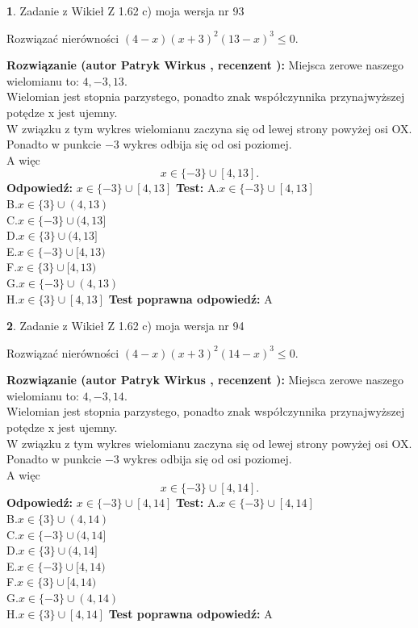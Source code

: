 \documentclass[12pt, a4paper]{article}
\theoremstyle{definition} %
\newtheorem{zad}{}
\newcommand{\zadStart}[1]{\begin{zad}#1\newline}
\newcommand{\zadStop}{\end{zad}}
\newcommand{\rozwStart}[2]{\noindent \textbf{Rozwiązanie (autor #1 , recenzent #2): }\newline}
\newcommand{\rozwStop}{\newline}
\newcommand{\odpStart}{\noindent \textbf{Odpowiedź:}\newline}
\newcommand{\odpStop}{\newline}
\newcommand{\testStart}{\noindent \textbf{Test:}\newline}
\newcommand{\testStop}{\newline}
\newcommand{\kluczStart}{\noindent \textbf{Test poprawna odpowiedź:}\newline}
\newcommand{\kluczStop}{\newline}
\begin{document}
\zadStart{Zadanie z Wikieł Z 1.62 c) moja wersja nr 93}

Rozwiązać nierówności $(4-x)(x+3)^{2}(13-x)^{3}\le0$.
\zadStop
\rozwStart{Patryk Wirkus}{}
Miejsca zerowe naszego wielomianu to: $4, -3, 13$.\\
Wielomian jest stopnia parzystego, ponadto znak współczynnika przy\linebreak najwyższej potędze x jest ujemny.\\ W związku z tym wykres wielomianu zaczyna się od lewej strony powyżej osi OX.\\
Ponadto w punkcie $-3$ wykres odbija się od osi poziomej.\\
A więc $$x \in \{-3\} \cup [4,13].$$
\rozwStop
\odpStart
$x \in \{-3\} \cup [4,13]$
\odpStop
\testStart
A.$x \in \{-3\} \cup [4,13]$\\
B.$x \in \{3\} \cup (4,13)$\\
C.$x \in \{-3\} \cup (4,13]$\\
D.$x \in \{3\} \cup (4,13]$\\
E.$x \in \{-3\} \cup [4,13)$\\
F.$x \in \{3\} \cup [4,13)$\\
G.$x \in \{-3\} \cup (4,13)$\\
H.$x \in \{3\} \cup [4,13]$
\testStop
\kluczStart
A
\kluczStop



\zadStart{Zadanie z Wikieł Z 1.62 c) moja wersja nr 94}

Rozwiązać nierówności $(4-x)(x+3)^{2}(14-x)^{3}\le0$.
\zadStop
\rozwStart{Patryk Wirkus}{}
Miejsca zerowe naszego wielomianu to: $4, -3, 14$.\\
Wielomian jest stopnia parzystego, ponadto znak współczynnika przy\linebreak najwyższej potędze x jest ujemny.\\ W związku z tym wykres wielomianu zaczyna się od lewej strony powyżej osi OX.\\
Ponadto w punkcie $-3$ wykres odbija się od osi poziomej.\\
A więc $$x \in \{-3\} \cup [4,14].$$
\rozwStop
\odpStart
$x \in \{-3\} \cup [4,14]$
\odpStop
\testStart
A.$x \in \{-3\} \cup [4,14]$\\
B.$x \in \{3\} \cup (4,14)$\\
C.$x \in \{-3\} \cup (4,14]$\\
D.$x \in \{3\} \cup (4,14]$\\
E.$x \in \{-3\} \cup [4,14)$\\
F.$x \in \{3\} \cup [4,14)$\\
G.$x \in \{-3\} \cup (4,14)$\\
H.$x \in \{3\} \cup [4,14]$
\testStop
\kluczStart
A
\kluczStop
\end{document}
